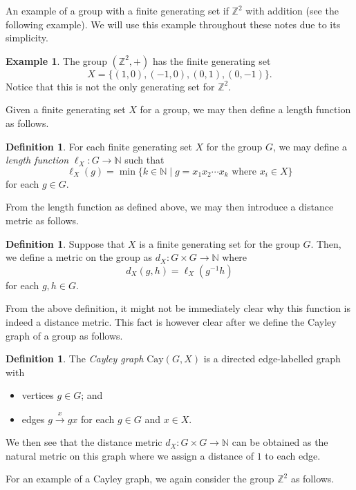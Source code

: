 \documentclass[11pt,a4paper,reqno]{amsart}
\theoremstyle{plain}
\theoremstyle{definition}
\newtheorem{definition}[theorem]{Definition}
\theoremstyle{definition}
\newtheorem{example}[theorem]{Example}
\newcommand\Cay{\mathrm{Cay}}
\begin{document}
An example of a group with a finite generating set if $\mathbb{Z}^2$ with addition (see the following example).
We will use this example throughout these notes due to its simplicity.

\begin{example}
	The group $(\mathbb{Z}^2,+)$ has the finite generating set
	\[
		X = \{(1,0),(-1,0),(0,1),(0,-1)\}.
	\]
	Notice that this is not the only generating set for $\mathbb{Z}^2$.
\end{example}

Given a finite generating set $X$ for a group, we may then define a length function as follows.

\begin{definition}
	For each finite generating set $X$ for the group $G$, we may define a \emph{length function} $\ell_X\colon G\to \mathbb N$ such that
	\[
		\ell_X(g)
		=
		\min
		\{
			k\in \mathbb{N}
		\mid
			g = x_1 x_2 \cdots x_k
			\text{ where }
			x_i\in X
		\}
	\]
	for each $g\in G$.
\end{definition}

From the length function as defined above, we may then introduce a distance metric as follows.

\begin{definition}\label{def:word-metric}
	Suppose that $X$ is a finite generating set for the group $G$.
	Then, we define a metric on the group as $d_X\colon G\times G\to \mathbb{N}$ where
	\[
		d_X(g,h) = \ell_X(g^{-1}h)
	\]
	for each $g,h\in G$.
\end{definition}

From the above definition, it might not be immediately clear why this function is indeed a distance metric.
This fact is however clear after we define the Cayley graph of a group as follows.

\begin{definition}\label{def:cayley-graph}
	The \emph{Cayley graph} $\Cay(G,X)$ is a directed edge-labelled graph with
	\begin{itemize}
		\item vertices $g\in G$; and
		\item edges $g \xrightarrow{x} gx$ for each $g\in G$ and $x\in X$.
	\end{itemize}
	We then see that the distance metric $d_X\colon G\times G\to \mathbb{N}$ can be obtained as the natural metric on this graph where we assign a distance of $1$ to each edge.
\end{definition}

For an example of a Cayley graph, we again consider the group $\mathbb{Z}^2$ as follows.
\end{document}
